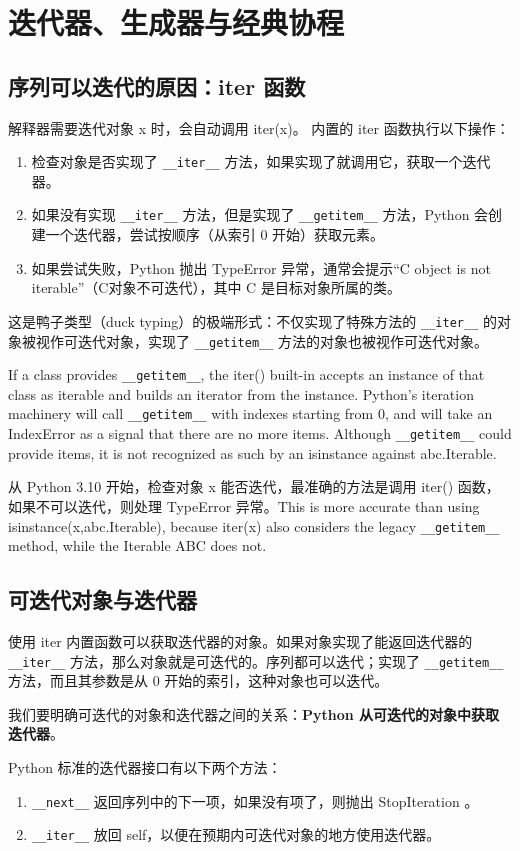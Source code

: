 \chapter{迭代器、生成器与经典协程\label{ch17}}
\section{序列可以迭代的原因：iter 函数}
解释器需要迭代对象 x 时，会自动调用 iter(x)。
内置的 iter 函数执行以下操作：
\begin{enumerate}
    \item 检查对象是否实现了 \verb|__iter__| 方法，如果实现了就调用它，获取一个迭代器。
    \item 如果没有实现 \verb|__iter__| 方法，但是实现了 \verb|__getitem__| 方法，Python 会创建一个迭代器，尝试按顺序（从索引 0 开始）获取元素。
    \item 如果尝试失败，Python 抛出 TypeError 异常，通常会提示“C object is not iterable”（C对象不可迭代），其中 C 是目标对象所属的类。
\end{enumerate}

这是鸭子类型（duck typing）的极端形式：不仅实现了特殊方法的 \verb|__iter__| 的对象被视作可迭代对象，实现了 \verb|__getitem__| 方法的对象也被视作可迭代对象。

If a class provides \verb|__getitem__|, the iter() built-in accepts an instance of that class as iterable and builds an iterator from the instance. Python’s iteration machinery will call \verb|__getitem__| with indexes starting from 0, and will take an IndexError as a signal that there are no more items. Although \verb|__getitem__| could provide items, it is not recognized as such by an isinstance against abc.Iterable.

从 Python 3.10 开始，检查对象 x 能否迭代，最准确的方法是调用 iter() 函数，如果不可以迭代，则处理 TypeError 异常。This is more accurate than using isinstance(x,abc.Iterable), because iter(x) also considers the legacy \verb|__getitem__| method, while the Iterable ABC does not.
\section{可迭代对象与迭代器}
使用 iter 内置函数可以获取迭代器的对象。如果对象实现了能返回迭代器的 \verb|__iter__| 方法，那么对象就是可迭代的。序列都可以迭代；实现了 \verb|__getitem__| 方法，而且其参数是从 0 开始的索引，这种对象也可以迭代。

我们要明确可迭代的对象和迭代器之间的关系：\textbf{Python 从可迭代的对象中获取迭代器}。

Python 标准的迭代器接口有以下两个方法：
\begin{enumerate}
    \item \verb|__next__| 返回序列中的下一项，如果没有项了，则抛出 StopIteration 。
    \item \verb|__iter__| 放回 self，以便在预期内可迭代对象的地方使用迭代器。
\end{enumerate}

